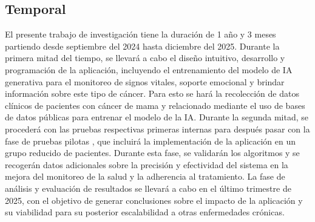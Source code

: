 \subsection{Temporal}
El presente trabajo de investigación tiene la duración de 1 año y 3 meses partiendo desde septiembre del 2024 hasta diciembre del 2025. Durante la primera mitad del tiempo, se llevará a cabo el diseño intuitivo, desarrollo y programación de la aplicación, incluyendo el entrenamiento del modelo de IA generativa para el monitoreo de signos vitales, soporte emocional y brindar información sobre este tipo de cáncer. Para esto se hará la recolección de datos clínicos de pacientes con cáncer de mama y relacionado mediante el uso de bases de datos públicas para entrenar el modelo de la IA. Durante la segunda mitad, se procederá con las pruebas respectivas primeras internas para después pasar con la fase de pruebas pilotas , que incluirá la implementación de la aplicación en un grupo reducido de pacientes. Durante esta fase, se validarán los algoritmos y se recogerán datos adicionales sobre la precisión y efectividad del sistema en la mejora del monitoreo de la salud y la adherencia al tratamiento. La fase de análisis y evaluación de resultados se llevará a cabo en el último trimestre de 2025, con el objetivo de generar conclusiones sobre el impacto de la aplicación y su viabilidad para su posterior escalabilidad a otras enfermedades crónicas.

